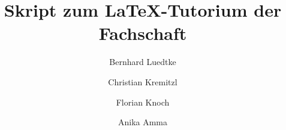 % 

\title{Skript zum \LaTeX-Tutorium der Fachschaft }
\author{Bernhard Luedtke \and Christian Kremitzl \and Florian Knoch \and Anika Amma}




\thispagestyle{empty}
\newpage

\setcounter{page}{1} %
\tableofcontents
\newpage





















